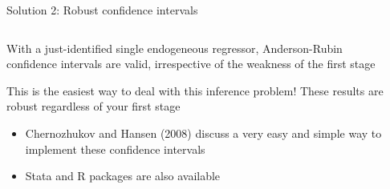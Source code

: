 \documentclass[notes,11pt, aspectratio=169]{beamer}
\newenvironment{wideitemize}{\itemize\addtolength{\itemsep}{10pt}}{\enditemize}
\begin{document}
\begin{frame}{Solution 2: Robust confidence intervals}
  \begin{columns}[T] %
    \begin{column}{0.5\textwidth}
      \begin{wideitemize}
      \item With a just-identified single endogeneous regressor,
        Anderson-Rubin confidence intervals are valid, irrespective of
        the weakness of the first stage
      \item This is the easiest way to deal with this inference
        problem! These results are robust regardless of your first
        stage
        \begin{itemize}
        \item Chernozhukov and Hansen (2008) discuss a very easy and simple way to implement these confidence intervals
        \item Stata and R packages are also available
        \end{itemize}
      \end{wideitemize}
    \end{column}
    \begin{column}{0.5\textwidth}
    \end{column}
  \end{columns}
\end{frame}
\end{document}
